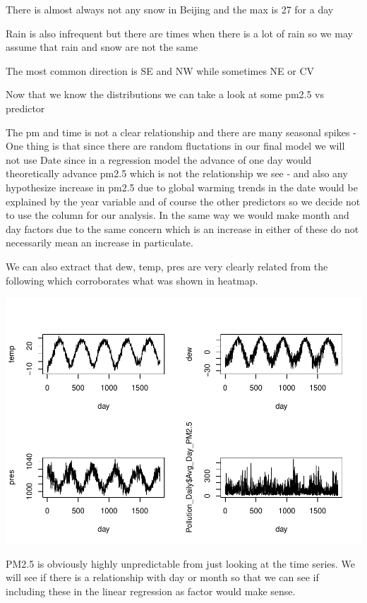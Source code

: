\documentclass[
]{report}
\begin{document}
There is almost always not any snow in Beijing and the max is 27 for a
day

Rain is also infrequent but there are times when there is a lot of rain
so we may assume that rain and snow are not the same

The most common direction is SE and NW while sometimes NE or CV

Now that we know the distributions we can take a look at some pm2.5 vs
predictor

The pm and time is not a clear relationship and there are many seasonal
spikes - One thing is that since there are random fluctations in our
final model we will not use Date since in a regression model the advance
of one day would theoretically advance pm2.5 which is not the
relationship we see - and also any hypothesize increase in pm2.5 due to
global warming trends in the date would be explained by the year
variable and of course the other predictors so we decide not to use the
column for our analysis. In the same way we would make month and day
factors due to the same concern which is an increase in either of these
do not necessarily mean an increase in particulate.

We can also extract that dew, temp, pres are very clearly related from
the following which corroborates what was shown in heatmap.

\includegraphics[height=0.9\textheight]{Final_7_files/figure-latex/unnamed-chunk-5-1}

PM2.5 is obviously highly unpredictable from just looking at the time
series. We will see if there is a relationship with day or month so that
we can see if including these in the linear regression as factor would
make sense.
\end{document}
